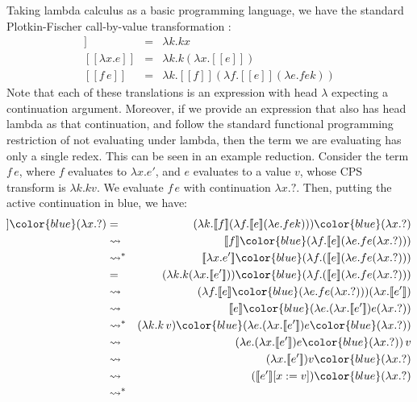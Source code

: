 \documentclass{sn-jnl}
\newcommand{\todo}[1]{\textcolor{red} {[todo: {#1}]}}
\newcommand{\db}[1]{[\![#1]\!]}
\begin{document}
Taking lambda calculus as a basic programming language, we have the standard Plotkin-Fischer call-by-value transformation \cite{plotkin1975call}: 
\begin{eqnarray*}
  \db{x} & =  & \lambda k. k x\\
  \db{\lambda x. e }& = & \lambda k. k (\lambda x. \db{e})\\
  \db{f\, e} & = & \lambda k. \db{f} (\lambda f. \db{e} (\lambda e. f e k))
\end{eqnarray*}
Note that each of these translations is an expression with head $\lambda$ expecting a continuation argument. Moreover, if we provide an expression that also has head lambda as that continuation, and follow the standard functional programming restriction of not evaluating under lambda, then the term we are evaluating has only a single redex. This can be seen in an example reduction. Consider the term $f\, e$, where $f$ evaluates to $\lambda x. e'$, and $e$ evaluates to a value $v$, whose CPS transform is $\lambda k. kv$. We evaluate $f\, e$
with continuation $\lambda x. ?$. Then, putting the active continuation in blue, we have:
\begin{eqnarray*}
    \db{f\, e} {\color{blue}(\lambda x. ?)} & = & (\lambda k. \db{f} (\lambda f. \db{e} (\lambda e. f e k))) {\color{blue}(\lambda x. ?)}\\
    & \leadsto & \db{f} {\color{blue}(\lambda f. \db{e} (\lambda e. f e (\lambda x. ?)))}\\
    & \leadsto^* & \db{\lambda x. e'} {\color{blue}(\lambda f. (\db{e} (\lambda e. f e (\lambda x. ?)))}\\
    & = & (\lambda k. k (\lambda x. \db{e'})) {\color{blue}(\lambda f. (\db{e} (\lambda e. f e (\lambda x. ?)))}\\
    & \leadsto & (\lambda f. \db{e} {\color{blue}(\lambda e. f e (\lambda x. ?))}) (\lambda x. \db{e'})\\
    & \leadsto & \db{e} {\color{blue} (\lambda e. (\lambda x. \db{e'}) e (\lambda x. ?))}\\
    & \leadsto^* & (\lambda k. k\, v) {\color{blue} (\lambda e. (\lambda x. \db{e'}) e {\color{blue}(\lambda x. ?)})}\\
    & \leadsto & (\lambda e. (\lambda x. \db{e'}) e {\color{blue}(\lambda x. ?)}) \, v\\
    & \leadsto & (\lambda x. \db{e'}) v {\color{blue}(\lambda x. ?)}\\
    & \leadsto & (\db{e'}[ x:= v]) {\color{blue}(\lambda x. ?)}\\
    & \leadsto^*
\end{eqnarray*}
\end{document}

